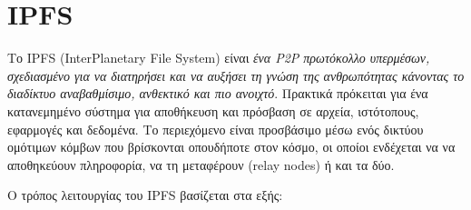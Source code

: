 \section{IPFS} \label{section:2-7-ipfs}


Το IPFS (InterPlanetary File System) είναι \textit{ένα P2P πρωτόκολλο υπερμέσων, σχεδιασμένο για να διατηρήσει και να αυξήσει τη γνώση της ανθρωπότητας κάνοντας το διαδίκτυο αναβαθμίσιμο, ανθεκτικό και πιο ανοιχτό}\cite{2.7-ipfs}.
Πρακτικά πρόκειται για ένα κατανεμημένο σύστημα για αποθήκευση και πρόσβαση σε αρχεία, ιστότοπους, εφαρμογές και δεδομένα. Το περιεχόμενο είναι προσβάσιμο μέσω ενός δικτύου ομότιμων κόμβων που βρίσκονται οπουδήποτε στον κόσμο, οι οποίοι ενδέχεται να να αποθηκεύουν πληροφορία, να τη μεταφέρουν (relay nodes) ή και τα δύο.\cite{2.7-ipfs-docs}

Ο τρόπος λειτουργίας του IPFS βασίζεται στα εξής:

